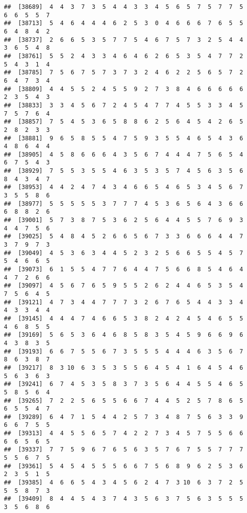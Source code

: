 \documentclass[
]{book}
\begin{document}
\begin{verbatim}
##  [38689]  4  4  3  7  3  5  4  4  3  3  4  5  6  5  7  5  7  7  5  6  6  5  5  7
##  [38713]  5  4  6  4  4  4  6  2  5  3  0  4  6  6  6  7  6  5  5  6  4  8  4  2
##  [38737]  2  6  6  5  3  5  7  7  5  4  6  7  5  7  3  2  5  4  4  3  6  5  4  8
##  [38761]  5  5  2  4  3  3  4  6  4  6  2  6  5  3  5  4  7  7  2  5  4  3  1  4
##  [38785]  7  5  6  7  5  7  3  7  3  2  4  6  2  2  5  6  5  7  2  6  4  7  3  4
##  [38809]  4  4  5  5  2  4  5  5  9  2  7  3  8  4  6  6  6  6  6  2  3  5  4  3
##  [38833]  3  3  4  5  6  7  2  4  5  4  7  7  4  5  5  3  3  4  5  7  5  7  6  4
##  [38857]  7  5  4  5  3  6  5  8  8  6  2  5  6  4  5  4  2  6  5  2  8  2  3  3
##  [38881]  9  6  5  8  5  5  4  7  5  9  3  5  5  4  6  5  4  3  6  4  8  6  4  4
##  [38905]  4  5  8  6  6  6  4  3  5  6  7  4  4  4  7  5  6  5  4  6  7  5  4  3
##  [38929]  7  5  5  3  5  5  4  6  3  5  3  5  7  4  5  6  3  5  6  8  4  3  4  7
##  [38953]  4  4  2  4  7  4  3  4  6  6  5  4  6  5  3  4  5  6  7  3  5  5  8  6
##  [38977]  5  5  5  5  5  3  7  7  7  4  5  3  6  5  6  4  3  6  6  6  8  8  2  6
##  [39001]  5  7  3  8  7  5  3  6  2  5  6  4  4  5  5  7  6  9  3  4  4  7  5  6
##  [39025]  5  4  8  4  5  2  6  6  5  6  7  3  3  6  6  6  4  4  7  3  7  9  7  3
##  [39049]  4  5  3  6  3  4  4  5  2  3  2  5  6  6  5  5  4  5  7  5  4  6  6  5
##  [39073]  6  1  5  5  4  7  7  6  4  4  7  5  6  6  8  5  4  6  4  4  7  2  6  6
##  [39097]  4  5  6  7  6  5  9  5  5  2  6  2  4  4  6  5  3  5  4  7  5  6  4  5
##  [39121]  4  7  3  4  4  7  7  7  3  2  6  7  6  5  4  4  3  3  4  4  3  3  4  4
##  [39145]  4  4  4  7  4  6  6  5  3  8  2  4  2  4  5  4  6  5  5  4  6  8  5  5
##  [39169]  5  6  5  3  6  4  6  8  5  8  3  5  4  5  9  6  6  9  6  4  3  8  3  5
##  [39193]  6  6  7  5  5  6  7  3  5  5  5  4  4  4  6  3  5  6  7  8  6  3  8  7
##  [39217]  8  3 10  6  3  5  3  5  5  6  4  5  4  1  6  4  5  4  6  5  6  3  6  3
##  [39241]  6  7  4  5  3  5  8  3  7  3  5  6  4  4  5  5  4  6  5  5  8  5  6  4
##  [39265]  7  2  2  5  6  5  5  6  6  7  4  4  5  2  5  7  8  6  5  6  5  5  4  7
##  [39289]  6  4  7  1  5  4  4  2  5  7  3  4  8  7  5  6  3  3  9  6  6  7  5  5
##  [39313]  4  4  5  5  6  5  7  4  2  2  7  3  4  5  7  5  5  6  6  6  6  5  6  5
##  [39337]  7  7  5  9  6  7  6  5  6  3  5  7  6  7  5  5  7  7  7  5  5  6  7  5
##  [39361]  5  4  5  4  5  5  5  6  6  7  5  6  8  9  6  2  5  3  6  2  3  5  1  5
##  [39385]  4  6  6  5  4  3  4  5  6  2  4  7  3 10  6  3  7  2  5  5  5  8  7  3
##  [39409]  8  4  4  5  4  3  7  4  3  5  6  3  7  5  6  3  5  5  5  3  5  6  8  6

\end{verbatim}
\end{document}
